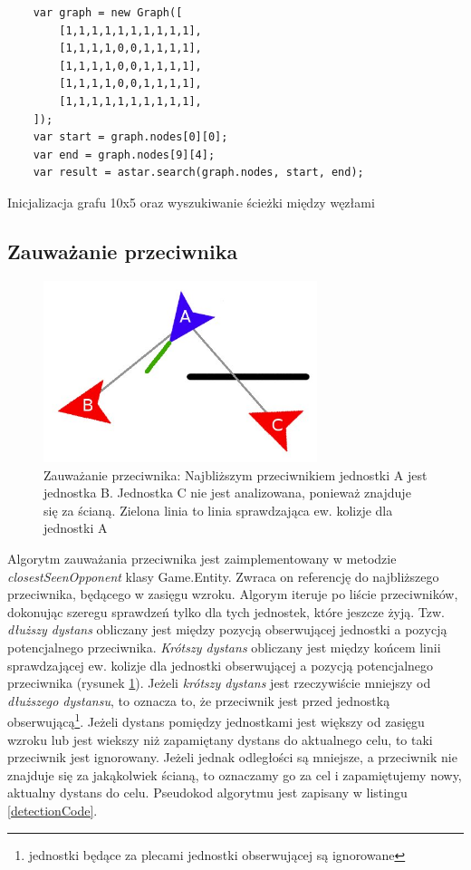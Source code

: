 \begin{table}
\begin{center}
\begin{lstlisting}
	var graph = new Graph([
		[1,1,1,1,1,1,1,1,1,1],
		[1,1,1,1,0,0,1,1,1,1],
		[1,1,1,1,0,0,1,1,1,1],
		[1,1,1,1,0,0,1,1,1,1],
		[1,1,1,1,1,1,1,1,1,1],
	]);
	var start = graph.nodes[0][0];
	var end = graph.nodes[9][4];
	var result = astar.search(graph.nodes, start, end);
 \end{lstlisting}
\caption {Inicjalizacja grafu 10x5 oraz wyszukiwanie ścieżki między węzłami}
\label{astarCode}
\end{center}
\end{table}

\subsection{Zauważanie przeciwnika}

\begin{figure}
\begin{center}
	\includegraphics[width=80mm,height=53mm]{images/detection}
	\caption[Zauważanie przeciwnika]{Zauważanie przeciwnika: Najbliższym przeciwnikiem jednostki A jest jednostka B. Jednostka C nie jest analizowana, ponieważ znajduje się za ścianą. Zielona linia to linia sprawdzająca ew. kolizje dla jednostki A\label{detectionImage}}
\end{center}
\end{figure}

Algorytm zauważania przeciwnika jest zaimplementowany w metodzie \emph{closestSeenOpponent} klasy Game.Entity. Zwraca on referencję do najbliższego przeciwnika, będącego w zasięgu wzroku. Algorym iteruje po liście przeciwników, dokonując szeregu sprawdzeń tylko dla tych jednostek, które jeszcze żyją. Tzw. \emph{dłuższy dystans} obliczany jest między pozycją obserwującej jednostki a pozycją potencjalnego przeciwnika. \emph{Krótszy dystans} obliczany jest między końcem linii sprawdzającej ew. kolizje dla jednostki obserwującej a pozycją potencjalnego przeciwnika (rysunek \ref{detectionImage}). Jeżeli \emph{krótszy dystans} jest rzeczywiście mniejszy od \emph{dłuższego dystansu}, to oznacza to, że przeciwnik jest przed jednostką obserwującą\footnote{jednostki będące za plecami jednostki obserwującej są ignorowane}. Jeżeli dystans pomiędzy jednostkami jest większy od zasięgu wzroku lub jest wiekszy niż zapamiętany dystans do aktualnego celu, to taki przeciwnik jest ignorowany. Jeżeli jednak odległości są mniejsze, a przeciwnik nie znajduje się za jakąkolwiek ścianą, to oznaczamy go za cel i zapamiętujemy nowy, aktualny dystans do celu. Pseudokod algorytmu jest zapisany w listingu \ref{detectionCode}.

